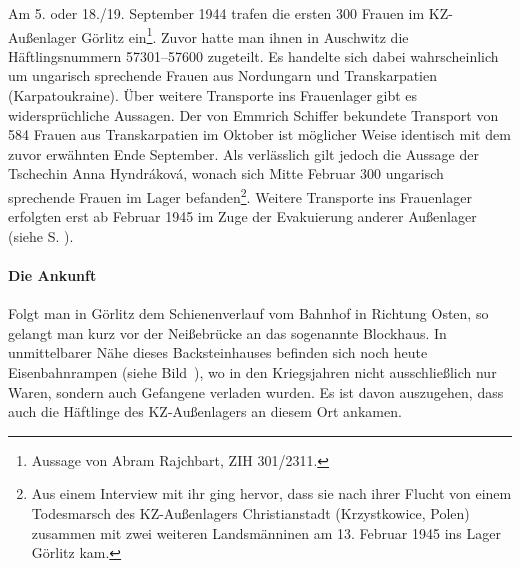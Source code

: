 \documentclass[a4paper,12pt,ngerman,
]{nisebook}
\begin{document}
Am 5. oder 18./19. September 1944 trafen die ersten 300 Frauen im KZ-Außenlager Görlitz ein\footnote{Aussage von Abram Rajchbart, ZIH 301/2311.}. Zuvor hatte man ihnen in Auschwitz die Häftlingsnummern 57301--57600 zugeteilt. Es handelte sich dabei wahrscheinlich um ungarisch sprechende Frauen aus Nordungarn und Transkarpatien (Karpatoukraine).
Über weitere Transporte ins Frauenlager gibt es widersprüchliche Aussagen. Der von Emmrich Schiffer bekundete Transport von 584 Frauen aus Transkarpatien im Oktober ist möglicher Weise identisch mit dem zuvor erwähnten Ende September. Als verlässlich gilt jedoch die Aussage der Tschechin Anna Hyndr\'akov\'a, wonach sich Mitte Februar 300 ungarisch sprechende Frauen im Lager befanden\footnote{Aus einem Interview mit ihr ging hervor, dass sie nach ihrer Flucht von einem Todesmarsch des KZ-Außenlagers Christianstadt (Krzystkowice, Polen) zusammen mit zwei weiteren Landsmänninen am 13. Februar 1945 ins Lager Görlitz kam.}.\newline
Weitere Transporte ins Frauenlager erfolgten erst ab Februar 1945 im Zuge der Evakuierung anderer Außenlager (siehe S. \pageref{eva_2}).

\paragraph{Die Ankunft}
Folgt man in Görlitz dem Schienenverlauf vom Bahnhof in Richtung Osten, so gelangt man kurz vor der Neißebrücke an das sogenannte Blockhaus. In unmittelbarer Nähe dieses Backsteinhauses befinden sich noch heute Eisenbahnrampen (siehe Bild~), wo in den Kriegsjahren nicht ausschließlich nur Waren, sondern auch Gefangene verladen wurden. Es ist davon auszugehen, dass auch die Häftlinge des KZ-Außenlagers an diesem Ort ankamen.
\end{document}
